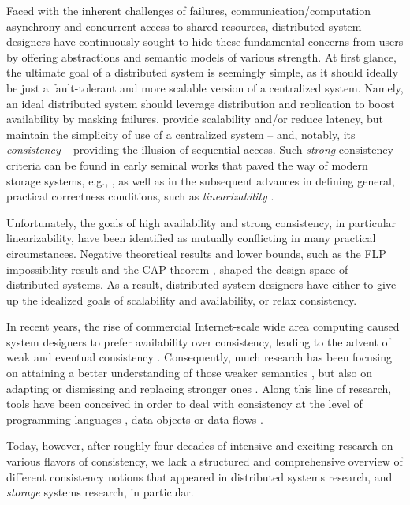 \documentclass[letter, 11pt]{article}
\renewcommand{\cite}{\citep}
\begin{document}
Faced with the inherent challenges of failures, communication/computation asynchrony and concurrent access to shared resources, distributed system designers have continuously sought to hide these fundamental concerns from users by offering abstractions and semantic models of various strength. At first glance, the ultimate goal of a distributed system is seemingly simple, as it should ideally be just a fault-tolerant and more scalable version of a centralized system. Namely, an ideal distributed system should leverage distribution and replication to boost availability by masking failures, provide scalability and/or reduce latency, but maintain the simplicity of use of a centralized system -- and, notably, its \emph{consistency} -- providing the illusion of sequential access. Such \emph{strong} consistency criteria can be found in early seminal works that paved the way of modern storage systems, e.g., \cite{Lamport:78,Lamport:86:vol1}, as well as  
in the subsequent advances in defining general, practical correctness conditions, such as \emph{linearizability} \cite{Herlihy.Wing:90}.

Unfortunately, the goals of high availability and strong consistency, in particular  linearizability, have been identified as mutually conflicting in many practical circumstances. Negative theoretical results and lower bounds, such as the FLP impossibility result \cite{Fischer.ea:85} and the CAP theorem \cite{Gilbert.Lynch:02}, shaped the design space of distributed systems. As a result, distributed system designers have either to give up the idealized goals of scalability and availability, or relax consistency. 

In recent years, the rise of commercial Internet-scale wide area computing caused system designers to prefer availability over consistency, leading to the advent of weak and eventual consistency \cite{Terry.Demers.ea:94,Saito.Shapiro:05,Vogels:08}.
Consequently, much research has been focusing on attaining a better understanding of
those weaker semantics \cite{Bailis.Ghodsi:13}, but also on adapting \cite{Bailis.Fakete.ea:14} 
or dismissing and replacing stronger ones \cite{Helland:07}.
Along this line of research, tools have been conceived in order to deal with consistency at the level of programming languages \cite{Alvaro.ea:11},
data objects \cite{Shapiro.ea:11,Burckhardt.ea:12} or data flows \cite{Alvaro.ea:13}.

Today, however, after roughly four decades of intensive and exciting research on various flavors of consistency, we lack a structured and comprehensive overview of different consistency notions that appeared in distributed systems research, and \emph{storage} systems research, in particular. 
\end{document}
